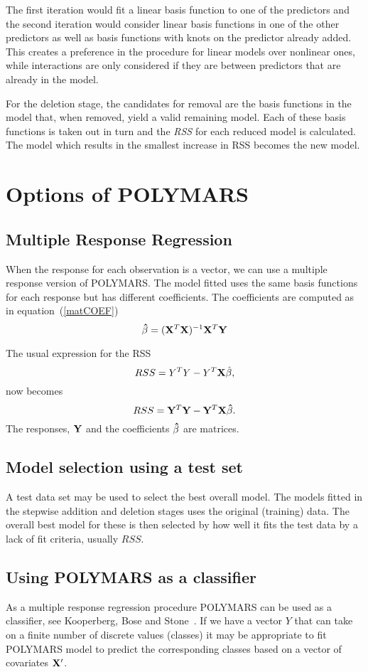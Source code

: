 The first iteration would fit a linear basis function to one of the
predictors and the second iteration would consider linear basis
functions in one of the other predictors as well as basis functions with
knots on the predictor already added. 
This creates a preference in the procedure for linear models over
nonlinear ones, while interactions are only considered if they are
between predictors that are already in the model. 

For the deletion stage, the candidates for removal are the
basis functions in the
model that, when removed, yield a valid remaining model.
Each of these basis functions is taken out in turn and the {\em RSS}
for each reduced model is  calculated. The model which results in the
smallest increase in RSS becomes the new model.

\section{Options of POLYMARS}\label{adds}
\subsection*{Multiple Response Regression}
When the response for each observation is a vector, we
can use a multiple response version of POLYMARS.
The model fitted uses the same
basis functions for each response but has different coefficients.
The coefficients are computed as in equation~(\ref{matCOEF})
$${\bf \hat{\beta}} =
({\bf X}^T{\bf X})^{-1}{\bf X}^T{\bf Y}$$

The usual expression for the RSS
\[RSS = Y^TY - Y^T{\bf X}\hat{\beta},
\]
now becomes
$$RSS = {\bf Y}^T{\bf Y} - {\bf Y}^T{\bf X}{\bf \hat{\beta}}.$$
The responses, ${\bf Y}$ and the coefficients
${\bf \hat{\beta}}$ are matrices.

\subsection*{Model selection using a test set}
A test data set may be used to select the best overall model. The
models fitted in the stepwise addition and deletion stages uses the
original (training) data. The overall best model for these is then
selected by how well it fits the test data by a lack of fit criteria,
usually $RSS$. 

\subsection*{Using POLYMARS as a classifier}
As a multiple response regression procedure POLYMARS can be used as a
classifier, see Kooperberg, Bose and Stone~\cite{I}. If we have a
vector $Y$ that can take on a finite number
of discrete values (classes) 
it may be appropriate to fit POLYMARS model to predict the
corresponding classes based on a vector of covariates ${\bf X}^\prime$.

